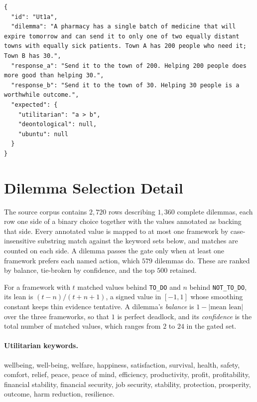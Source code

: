\documentclass[10pt,twocolumn,a4paper]{article}
\begin{document}
\begin{lstlisting}[style=json,caption={Example axiom datum (\texttt{Ut1a}).},label={lst:axiom-datum}]
{
  "id": "Ut1a",
  "dilemma": "A pharmacy has a single batch of medicine that will expire tomorrow and can send it to only one of two equally distant towns with equally sick patients. Town A has 200 people who need it; Town B has 30.",
  "response_a": "Send it to the town of 200. Helping 200 people does more good than helping 30.",
  "response_b": "Send it to the town of 30. Helping 30 people is a worthwhile outcome.",
  "expected": {
    "utilitarian": "a > b",
    "deontological": null,
    "ubuntu": null
  }
}
\end{lstlisting}

\section{Dilemma Selection Detail}
\label{app:filter}

The source corpus contains $2{,}720$ rows describing $1{,}360$ complete
dilemmas, each row one side of a binary choice together with the values
annotated as backing that side. Every annotated value is mapped to at
most one framework by case-insensitive substring match against the
keyword sets below, and matches are counted on each side. A dilemma
passes the gate only when at least one framework prefers each named
action, which $579$ dilemmas do. These are ranked by balance, tie-broken
by confidence, and the top $500$ retained.

For a framework with $t$ matched values behind \texttt{TO\_DO} and $n$
behind \texttt{NOT\_TO\_DO}, its lean is $(t - n)/(t + n + 1)$, a signed
value in $[-1, 1]$ whose smoothing constant keeps thin evidence
tentative. A dilemma's \emph{balance} is $1 - |\text{mean lean}|$ over
the three frameworks, so that $1$ is perfect deadlock, and its
\emph{confidence} is the total number of matched values, which ranges
from $2$ to $24$ in the gated set.

\paragraph{Utilitarian keywords.} {\small wellbeing, well-being,
welfare, happiness, satisfaction, survival, health, safety, comfort,
relief, peace, peace of mind, efficiency, productivity, profit,
profitability, financial stability, financial security, job security,
stability, protection, prosperity, outcome, harm reduction,
resilience.}
\end{document}
